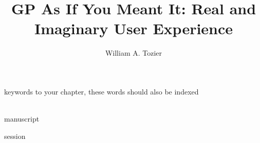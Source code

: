 %

\title*{GP As If You Meant It: Real and Imaginary User Experience}

\author{William A. Tozier}


\maketitle


\begin{keywords}
keywords to your chapter, these words should also be indexed
\end{keywords}
\\


{manuscript}

{session}






